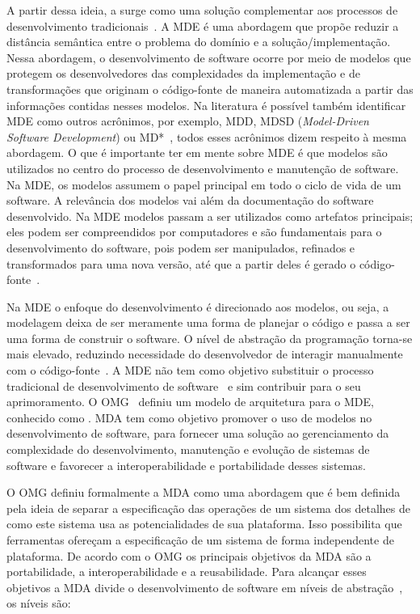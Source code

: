 A partir dessa ideia, a  surge como uma solução complementar aos processos de desenvolvimento tradicionais~\cite{Lima_2007}. A MDE é uma abordagem que propõe reduzir a distância semântica entre o problema do domínio e a solução/implementação. Nessa abordagem, o desenvolvimento de software ocorre por meio de modelos que protegem os desenvolvedores das complexidades da implementação e de transformações que originam o código-fonte de maneira automatizada a partir das informações contidas nesses modelos. Na literatura é possível também identificar MDE como outros acrônimos, por exemplo, MDD, MDSD (\textit{Model-Driven Software Development}) ou MD*~\cite{Kleppe:2003}, todos esses acrônimos dizem respeito à mesma abordagem. O que é importante ter em mente sobre MDE é que modelos são utilizados no centro do processo de desenvolvimento e manutenção de software. Na MDE, os modelos assumem o papel principal em todo o ciclo de vida de um software. A relevância dos modelos vai além da documentação do software desenvolvido. Na MDE modelos passam a ser utilizados como artefatos principais; eles podem ser compreendidos por computadores e são fundamentais para o desenvolvimento do software, pois podem ser manipulados, refinados e transformados para uma nova versão, até que a partir deles é gerado o código-fonte~\cite{Kleppe:2003, Brown_2007, Ben_Ammar}.

Na MDE o enfoque do desenvolvimento é direcionado aos modelos, ou seja, a modelagem deixa de ser meramente uma forma de planejar o código e passa a ser uma forma de construir o software. O nível de abstração da programação torna-se mais elevado, reduzindo necessidade do desenvolvedor de interagir manualmente com o código-fonte~\cite{Braganca_Machado}. A MDE não tem como objetivo substituir o processo tradicional de desenvolvimento de software~\cite{Kleppe:2003, Brown_2007, Braganca_Machado} e sim contribuir para o seu aprimoramento. O OMG~\cite{ADM:OMG} definiu um modelo de arquitetura para o MDE, conhecido como . MDA tem como objetivo promover o uso de modelos no desenvolvimento de software, para fornecer uma solução ao gerenciamento da complexidade do desenvolvimento, manutenção e evolução de sistemas de software e favorecer a interoperabilidade e portabilidade desses sistemas.

O OMG definiu formalmente a MDA como uma abordagem que é bem definida pela ideia de separar a especificação das operações de um sistema dos detalhes de como este sistema usa as potencialidades de sua plataforma. Isso possibilita que ferramentas ofereçam a especificação de um sistema de forma independente de plataforma. De acordo com o OMG os principais objetivos da MDA são a portabilidade, a interoperabilidade e a reusabilidade. Para alcançar esses objetivos a MDA divide o desenvolvimento de software em níveis de abstração~\cite{France_2007, Ben_Ammar}, os níveis são:

